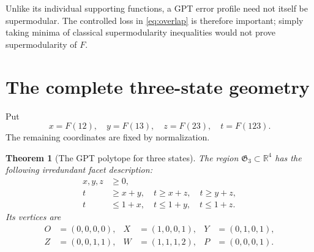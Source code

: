 \documentclass[a4paper,11pt,onecolumn,unpublished]{quantumarticle}
\newtheorem{theorem}{Theorem}[section]
\theoremstyle{definition}
\newcommand{\R}{\mathbb R}
\newcommand{\1}{\mathbf 1}
\newcommand{\Greg}{\mathfrak G}
\begin{document}
Unlike its individual supporting functions, a GPT error profile need not itself
be supermodular. The controlled loss in \eqref{eq:overlap} is therefore
important; simply taking minima of classical supermodularity inequalities
would not prove supermodularity of $F$.

\section{The complete three-state geometry}\label{sec:three}

Put
\begin{equation}\label{eq:three-coordinates}
 x=F(12),\quad y=F(13),\quad z=F(23),\quad t=F(123).
\end{equation}
The remaining coordinates are fixed by normalization.

\begin{theorem}[The GPT polytope for three states]\label{thm:G3}
The region $\Greg_3\subset\R^4$ has the following irredundant facet description:
\begin{align}
 x,y,z&\ge0,\label{eq:G3-positive}\\
 t&\ge x+y,\quad t\ge x+z,\quad t\ge y+z,\label{eq:G3-lower}\\
 t&\le1+x,\quad t\le1+y,\quad t\le1+z.\label{eq:G3-upper}
\end{align}
Its vertices are
\begin{align*}
 O&=(0,0,0,0),& X&=(1,0,0,1),&Y&=(0,1,0,1),\\
 Z&=(0,0,1,1),& W&=(1,1,1,2),&P&=(0,0,0,1).
\end{align*}
\end{theorem}
\end{document}
